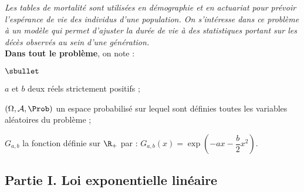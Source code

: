 \documentclass[11pt]{article}%
\begin{document}
\noindent %
{\it Les tables de mortalité sont utilisées en démographie et en
  actuariat pour prévoir l'espérance de vie des individus d'une
  population. On s'intéresse dans ce problème à un modèle qui permet
  d'ajuster la durée de vie à des statistiques portant sur les décès
  observés au sein d'une génération.}\\
{\bf Dans tout le problème}, on note :
\begin{noliste}{$\sbullet$}
\item $a$ et $b$ deux réels strictement positifs ;
\item $(\Omega,\mathcal{A},\Prob)$ un espace probabilisé sur lequel sont
  définies toutes les variables aléatoires du problème ;
\item $G_{a,b}$ la fonction définie sur $\R_+$ par :
  $G_{a,b}(x)=\exp\left(-ax-\dfrac{b}{2}x^2\right)$.
\end{noliste}

\subsection*{Partie I. Loi exponentielle linéaire}
\end{document}
